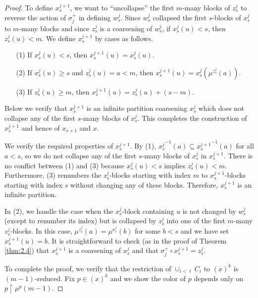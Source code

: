 \documentclass{amsart}
\theoremstyle{definition}
\theoremstyle{remark}
\newcommand{\restrict}{\upharpoonright}
\newcommand{\block}[2]{{#1}^{-1}(#2)}
\begin{document}
\begin{proof}
To define $x_s^{j+1}$, we want to ``uncollapse'' the first $m$-many blocks of $z_s^j$ to reverse the action of $\sigma_{j}^+$ in defining $w_s^j$. Since 
$w_s^j$ collapsed the first $s$-blocks of $x_s^j$ to $m$-many blocks and since $z_s^j$ is a coarsening of $w_s^j$, if $x_s^j(u) < s$, then $z_s^j(u) < m$. 
We define $x_s^{j+1}$ by cases as follows.
\begin{enumerate}
\item[(1)] If $x_s^j(u) < s$, then $x_s^{j+1}(u) = x_s^j(u)$. 
\item[(2)] If $x_s^j(u) \geq s$ and $z_s^j(u) = a < m$, then $x_s^{j+1}(u) = x_s^j(\mu^{z_s^j}(a))$.
\item[(3)] If $z_s^j(u) \geq m$, then $x_s^{j+1}(u) = z_s^j(u)+(s-m)$.
\end{enumerate}
Below we verify that $x_s^{j+1}$ is an infinite partition coarsening $x_s^j$ which does not collapse any of the first $s$-many blocks of $x_s^j$. 
This completes the construction of $x_s^{j+1}$ and hence of $x_{s+1}$ and $x$.

We verify the required properties of $x_s^{j+1}$. By (1), $\block{x_s^j}{a} \subseteq \block{x_s^{j+1}}{a}$ for all $a < s$, so we do not collapse any of the first $s$-many blocks 
of $x_s^j$ in $x_s^{j+1}$. There is no conflict between (1) and (3) because $x_s^j(u) < s$ implies $z_s^j(u) < m$. Furthermore, (3) renumbers the 
$z_s^j$-blocks starting with index $m$ to $x_s^{j+1}$-blocks starting with index $s$ without changing any of these blocks. Therefore, $x_s^{j+1}$ is an infinite partition. 

In (2), we handle the case when the $x_s^j$-block containing $u$ is not changed by $w_s^j$ (except to renumber its index) but is collapsed by 
$z_s^j$ into one of the first $m$-many $z_s^j$-blocks. In this case, $\mu^{z_s^j}(a) = \mu^{x_s^j}(b)$ for some $b < s$ and we have set $x_s^{j+1}(u) = b$. 
It is straightforward to check (as in the proof of Theorem \ref{thm:2.4}) that $x_s^{j+1}$ is a coarsening of $x_s^j$ and that $\sigma_{j}^+ \circ x_s^{j+1} = z_s^j$. 



To complete the proof, we verify that the restriction of $\cup_{i < \ell} C_i$ to $(x)^k$ is
$(m-1)$-reduced.  Fix $p \in (x)^k$ and we show the color of $p$ depends only on $p\restrict \mu^p(m-1)$.


\end{proof}
\end{document}
